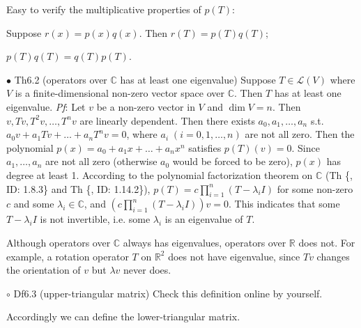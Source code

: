 \documentclass{article}
\begin{document}
\begin{Rmk}{}
    \textcolor{Th}{Easy to verify the multiplicative properties of $p(T)$:}
    \textcolor{Th}{
    \begin{compactitem}
        \item Suppose $r(x) = p(x)q(x)$. Then $r(T) = p(T)q(T)$;
        \item $p(T)q(T) = q(T)p(T)$.
    \end{compactitem}
    }
\end{Rmk}

\begin{Th}{$\bullet$ Th6.2 (operators over $\mathbb{C}$ has at least one eigenvalue)}
    Suppose $T\in\mathcal{L}(V)$ where $V$ is a finite-dimensional non-zero vector space over $\mathbb{C}$. Then $T$ has at least one eigenvalue.
    \tcblower
    \textit{Pf}: Let $v$ be a non-zero vector in $V$ and $\dim V=n$. Then $v, Tv, T^2v, \dots, T^nv$ are linearly dependent. Then there exists $a_0, a_1, \dots, a_n$ s.t. $a_0v+a_1Tv+\dots+a_nT^nv=0$, where $a_i \;(i=0,1,\dots, n)$ are not all zero. Then the polynomial $p(x) = a_0+a_1x+\dots+a_nx^n$ satisfies $p(T)(v) = 0$. Since $a_1, \dots, a_n$ are not all zero (otherwise $a_0$ would be forced to be zero), $p(x)$ has degree at least 1. According to the polynomial factorization theorem on $\mathbb{C}$ (Th \{, ID: 1.8.3\} and Th \{, ID: 1.14.2\}), $p(T) = c\prod_{i=1}^n (T-\lambda_iI)$ for some non-zero $c$ and some $\lambda_i\in\mathbb{C}$, and $\left(c\prod_{i=1}^n (T-\lambda_iI)\right)v = 0$. This indicates that some $T-\lambda_i I$ is not invertible, i.e. some $\lambda_i$ is an eigenvalue of $T$.
\end{Th}

\begin{Rmk}{}
    \textcolor{Th}{Although operators over $\mathbb{C}$ always has eigenvalues, operators over $\mathbb{R}$ does not}. For example, a rotation operator $T$ on $\mathbb{R}^2$ does not have eigenvalue, since $Tv$ changes the orientation of $v$ but $\lambda v$ never does.
\end{Rmk}

\begin{Df}{$\circ$ Df6.3 (upper-triangular matrix)}
    Check this definition online by yourself.
\end{Df}

\begin{Rmk}{}
    Accordingly we can define the \textcolor{Df}{lower-triangular matrix.}
\end{Rmk}
\end{document}
